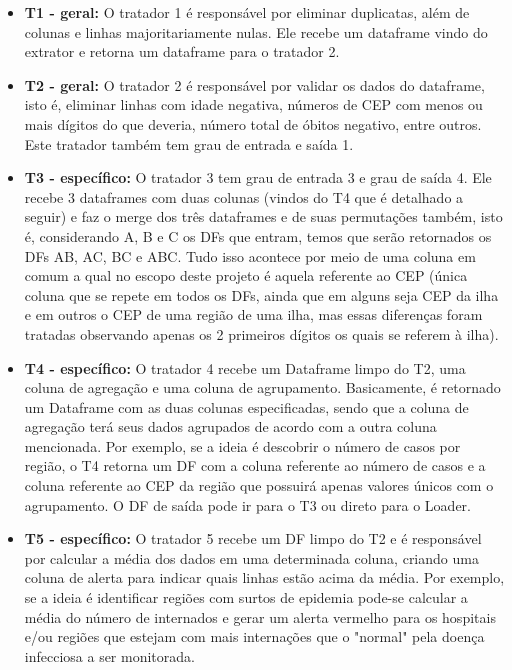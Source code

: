 \documentclass[a4paper,12pt]{article}
\begin{document}
\begin{itemize}
    \item \textbf{T1 - geral:} O tratador 1 é responsável por eliminar duplicatas, além de colunas e linhas majoritariamente nulas. Ele recebe um dataframe vindo do extrator e retorna um dataframe para o tratador 2.

    \item \textbf{T2 - geral:} O tratador 2 é responsável por validar os dados do dataframe, isto é, eliminar linhas com idade negativa, números de CEP com menos ou mais dígitos do que deveria, número total de óbitos negativo, entre outros. Este tratador também tem grau de entrada e saída 1.
    
    \item \textbf{T3 - específico:} O tratador 3 tem grau de entrada 3 e grau de saída 4. Ele recebe 3 dataframes com duas colunas (vindos do T4 que é detalhado a seguir) e faz o merge dos três dataframes e de suas permutações também, isto é, considerando A, B e C os DFs que entram, temos que serão retornados os DFs AB, AC, BC e ABC. Tudo isso acontece por meio de uma coluna em comum a qual no escopo deste projeto é aquela referente ao CEP (única coluna que se repete em todos os DFs, ainda que em alguns seja CEP da ilha e em outros o CEP de uma região de uma ilha, mas essas diferenças foram tratadas observando apenas os 2 primeiros dígitos os quais se referem à ilha).
    
    \item \textbf{T4 - específico:} O tratador 4 recebe um Dataframe limpo do T2, uma coluna de agregação e uma coluna de agrupamento. Basicamente, é retornado um Dataframe com as duas colunas especificadas, sendo que a coluna de agregação terá seus dados agrupados de acordo com a outra coluna mencionada. Por exemplo, se a ideia é descobrir o número de casos por região, o T4 retorna um DF com a coluna referente ao número de casos e a coluna referente ao CEP da região que possuirá apenas valores únicos com o agrupamento. O DF de saída pode ir para o T3 ou direto para o Loader.
    
    \item \textbf{T5 - específico:} O tratador 5 recebe um DF limpo do T2 e é responsável por calcular a média dos dados em uma determinada coluna, criando uma coluna de alerta para indicar quais linhas estão acima da média. Por exemplo, se a ideia é identificar regiões com surtos de epidemia pode-se calcular a média do número de internados e gerar um alerta vermelho para os hospitais e/ou regiões que estejam com mais internações que o "normal" pela doença infecciosa a ser monitorada.
    
\end{itemize}
\end{document}
